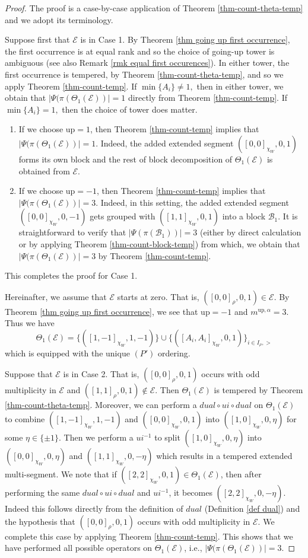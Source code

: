 \documentclass[11pt,letterpaper]{amsart}
\newcommand{\up}{{\mathrm{up}}}
\newcommand{\BB}{\mathcal{B}}
\newcommand{\EE}{\mathcal{E}}
\numberwithin{equation}{section}
\begin{document}
\begin{proof}
    The proof is a case-by-case application of Theorem \ref{thm-count-theta-temp} and we adopt its terminology. 
    
    Suppose first that $\EE$ is in Case 1. By Theorem \ref{thm going up first occurrence}, the first occurrence is at equal rank and so the choice of going-up tower is ambiguous (see also Remark \ref{rmk equal first occurences}). In either tower, the first occurrence is tempered, by Theorem \ref{thm-count-theta-temp}, and so we apply Theorem \ref{thm-count-temp}. If $\min\{A_i\}\neq 1,$ then in either tower, we obtain that $|\Psi(\pi(\Theta_1(\EE))|=1$ directly from Theorem \ref{thm-count-temp}. If $\min\{A_i\}=1,$ then the choice of tower does matter.
    \begin{enumerate}
        \item If we choose $\up=1$, then Theorem \ref{thm-count-temp} implies that $|\Psi(\pi(\Theta_1(\EE))|=1$. Indeed, the added extended segment $([0,0]_{\chi_W},0,1)$ forms its own block and the rest of block decomposition of $\Theta_1(\EE)$ is obtained from $\EE$.
        \item If we choose $\up=-1$, then Theorem \ref{thm-count-temp} implies that $|\Psi(\pi(\Theta_1(\EE))|=3$. Indeed, in this setting, the added extended segment $([0,0]_{\chi_W},0,-1)$ gets grouped with $([1,1]_{\chi_W},0,1)$ into a block $\BB_1$. It is straightforward to verify that $|\Psi(\pi(\BB_1))|=3$ (either by direct calculation or by applying Theorem \ref{thm-count-block-temp}) from which, we obtain that $|\Psi(\pi(\Theta_1(\EE))|=3$ by Theorem \ref{thm-count-temp}.
    \end{enumerate}
This completes the proof for Case 1.

Hereinafter, we assume that $\EE$ starts at zero. That is, $([0,0]_\rho,0,1)\in\EE$. By Theorem \ref{thm going up first occurrence}, we see that $\up=-1$ and $m^{\up,\alpha}=3$. Thus we have
\[
\Theta_1(\EE)=\{([1,-1]_{\chi_W},1,-1)\}\cup\{([A_i,A_i]_{\chi_W},0,1)\}_{i\in I_\rho,>}
\]
which is equipped with the unique $(P')$ ordering.

Suppose that $\EE$ is in Case 2. That is, $([0,0]_\rho,0,1)$ occurs with odd multiplicity in $\EE$ and $([1,1]_{\rho},0,1)\not\in\EE$.  Then $\Theta_1(\EE)$ is tempered by Theorem \ref{thm-count-theta-temp}. Moreover, we can perform a $dual\circ ui\circ dual$ on $\Theta_1(\EE)$ to combine $([1,-1]_{\chi_W},1,-1)$ and $([0,0]_{\chi_W},0,1)$ into $([1,0]_{\chi_W},0,\eta)$ for some $\eta\in\{\pm1\}$. Then we perform a $ui^{-1}$ to split $([1,0]_{\chi_W},0,\eta)$ into $([0,0]_{\chi_W},0,\eta)$ and $([1,1]_{\chi_W},0,-\eta)$ which results in a tempered extended multi-segment. We note that if $([2,2]_{\chi_W},0,1)\in\Theta_1(\EE)$, then after performing the same $dual\circ ui\circ dual$ and $ui^{-1}$, it becomes $([2,2]_{\chi_W},0,-\eta)$. Indeed this follows directly from the definition of $dual$ (Definition \ref{def dual}) and the hypothesis that $([0,0]_\rho,0,1)$ occurs with odd multiplicity in $\EE$.
We complete this case by applying Theorem \ref{thm-count-temp}. This shows that we have performed all possible operators on $\Theta_1(\EE)$, i.e., $|\Psi(\pi(\Theta_1(\EE))|=3$.



\end{proof}
\end{document}

